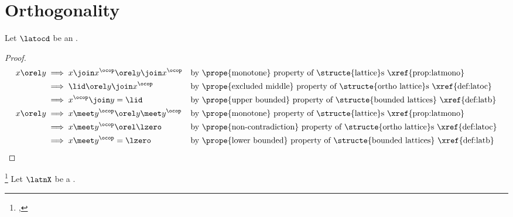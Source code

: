 \section{Orthogonality}
\begin{proposition}
\label{prop:latoc_x_orel_y}
Let $\latocd$ be an  .
\end{proposition}
\begin{proof}
\begin{align*}
  x \orel y
    &\implies x\join x^\ocop \orel y\join x^\ocop
    && \text{by \prope{monotone} property of \structe{lattice}s \xref{prop:latmono}}
  \\&\implies \lid \orel y\join x^\ocop
    && \text{by \prope{excluded middle} property of \structe{ortho lattice}s \xref{def:latoc}}
  \\&\implies x^\ocop\join y = \lid
    && \text{by \prope{upper bounded} property of \structe{bounded lattices} \xref{def:latb}}
  \\
  x \orel y
    &\implies x\meet y^\ocop \orel y\meet y^\ocop
    && \text{by \prope{monotone} property of \structe{lattice}s \xref{prop:latmono}}
  \\&\implies x\meet y^\ocop \orel \lzero
    && \text{by \prope{non-contradiction} property of \structe{ortho lattice}s \xref{def:latoc}}
  \\&\implies x\meet y^\ocop = \lzero
    && \text{by \prope{lower bounded} property of \structe{bounded lattices} \xref{def:latb}}
\end{align*}
\end{proof}

\begin{definition}
\footnote{
  ,
  }
\label{def:latoc_orthog}
Let $\latnX$ be a  .
\end{definition}


